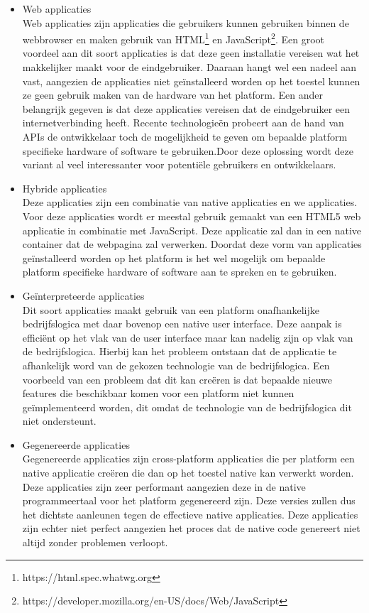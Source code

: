 \begin{itemize}
    \item Web applicaties\\
    Web applicaties zijn applicaties die gebruikers kunnen gebruiken binnen de webbrowser en maken gebruik van HTML\footnote{https://html.spec.whatwg.org} en JavaScript\footnote{https://developer.mozilla.org/en-US/docs/Web/JavaScript}. Een groot voordeel aan dit soort applicaties is dat deze geen installatie vereisen wat het makkelijker maakt voor de eindgebruiker. Daaraan hangt wel een nadeel aan vast, aangezien de applicaties niet geïnstalleerd worden op het toestel kunnen ze geen gebruik maken van de hardware van het platform. Een ander belangrijk gegeven is dat deze applicaties vereisen dat de eindgebruiker een internetverbinding heeft. Recente technologieën probeert aan de hand van APIs de ontwikkelaar toch de mogelijkheid te geven om bepaalde platform specifieke hardware of software te gebruiken.Door deze oplossing wordt deze variant al veel interessanter voor potentiële gebruikers en ontwikkelaars.
    \\
     
    \item Hybride applicaties\\
    Deze applicaties zijn een combinatie van native applicaties en we applicaties. Voor deze applicaties wordt er meestal gebruik gemaakt van een HTML5 web applicatie in combinatie met JavaScript. Deze applicatie zal dan in een native container dat de webpagina zal verwerken. Doordat deze vorm van applicaties geïnstalleerd worden op het platform is het wel mogelijk om bepaalde platform specifieke hardware of software aan te spreken en te gebruiken.
    \\
    
    \item Geïnterpreteerde applicaties\\
    Dit soort applicaties maakt gebruik van een platform onafhankelijke bedrijfslogica met daar bovenop een native user interface. Deze aanpak is efficiënt op het vlak van de user interface maar kan nadelig zijn op vlak van de bedrijfslogica. Hierbij kan het probleem ontstaan dat de applicatie te afhankelijk word van de gekozen technologie van de bedrijfslogica. Een voorbeeld van een probleem dat dit kan creëren is dat bepaalde nieuwe features die beschikbaar komen voor een platform niet kunnen geïmplementeerd worden, dit omdat de technologie van de bedrijfslogica dit niet ondersteunt.
    \\
    
    \item Gegenereerde applicaties\\
    Gegenereerde applicaties zijn cross-platform applicaties die per platform een native applicatie creëren die dan op het toestel native kan verwerkt worden. Deze applicaties zijn zeer performant aangezien deze in de native programmeertaal voor het platform gegenereerd zijn. Deze versies zullen dus het dichtste aanleunen tegen de effectieve native applicaties. Deze applicaties zijn echter niet perfect aangezien het proces dat de native code genereert niet altijd zonder problemen verloopt.
\end{itemize}

